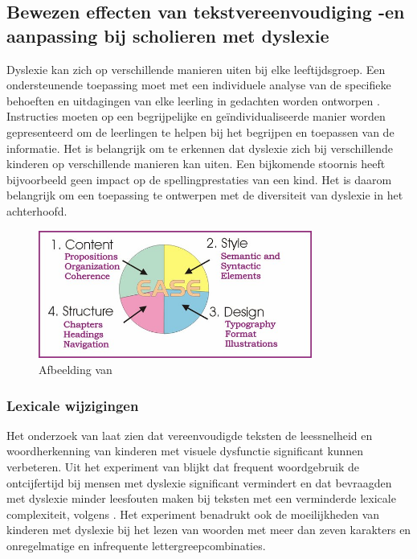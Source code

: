 \subsection{Bewezen effecten van tekstvereenvoudiging -en aanpassing bij scholieren met dyslexie}

Dyslexie kan zich op verschillende manieren uiten bij elke leeftijdsgroep. Een ondersteunende toepassing moet met een individuele analyse van de specifieke behoeften en uitdagingen van elke leerling in gedachten worden ontworpen \autocite{Gooding2022}. Instructies moeten op een begrijpelijke en geïndividualiseerde manier worden gepresenteerd om de leerlingen te helpen bij het begrijpen en toepassen van de informatie. Het is belangrijk om te erkennen dat dyslexie zich bij verschillende kinderen op verschillende manieren kan uiten. Een bijkomende stoornis heeft bijvoorbeeld geen impact op de spellingprestaties van een kind. Het is daarom belangrijk om een toepassing te ontwerpen met de diversiteit van dyslexie in het achterhoofd.

\begin{figure}[H]
	\begin{center}
		\includegraphics[width=9cm]{img/text-simplification-reading-ease.png}
	\end{center}
	\caption{Afbeelding van \textcite{Dubay2004}}
\end{figure}


\subsubsection{Lexicale wijzigingen}

Het onderzoek van \textcite{RiveroContreras2021} laat zien dat vereenvoudigde teksten de leessnelheid en woordherkenning van kinderen met visuele dysfunctie significant kunnen verbeteren. Uit het experiment van \textcite{Rello2013a} blijkt dat frequent woordgebruik de ontcijfertijd bij mensen met dyslexie significant vermindert en dat bevraagden met dyslexie minder leesfouten maken bij teksten met een verminderde lexicale complexiteit, volgens \textcite{Gala2016}. Het experiment benadrukt ook de moeilijkheden van kinderen met dyslexie bij het lezen van woorden met meer dan zeven karakters en onregelmatige en infrequente lettergreepcombinaties.

